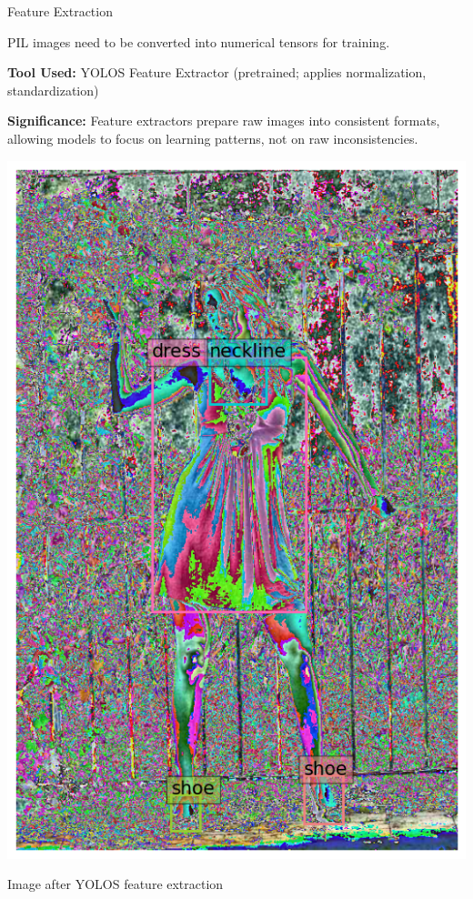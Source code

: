 \begin{frame}{Feature Extraction}
\begin{minipage}{0.68\textwidth}
    PIL images need to be converted into numerical tensors for training.

    \vspace{1em}
    \textbf{Tool Used:}
    YOLOS Feature Extractor (pretrained; applies normalization, standardization)

    \vspace{0.75em}
    \begin{block}{}
      \textbf{Significance: }Feature extractors prepare raw images into consistent formats,
      allowing models to focus on learning patterns, not on raw inconsistencies.
    \end{block}
  \end{minipage}
\hfill
\begin{minipage}{0.25\textwidth}
    \centering
    \includegraphics[width=0.9\linewidth]{../report_final/images/yolos.png}

    \vspace{0.5em}
    \small Image after YOLOS feature extraction
\end{minipage}
\end{frame}


